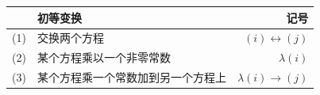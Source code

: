 \begin{tabular}{r||l|r}
&初等变换 & 记号\\\hline\hline
(1) & 交换两个方程 & $(i)\leftrightarrow(j)$\\\hline
(2) & 某个方程乘以一个非零常数 & $\lambda(i)$\\\hline
(3) & 某个方程乘一个常数加到另一个方程上 & $\lambda(i)\rightarrow (j)$\\
\end{tabular}